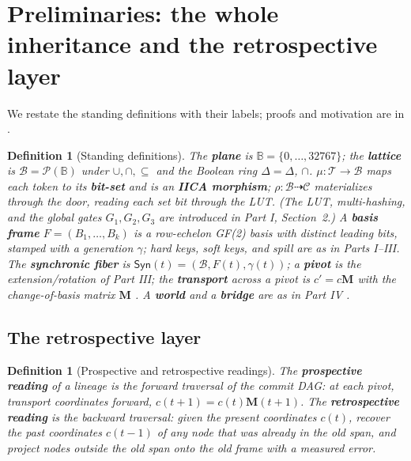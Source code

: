 \documentclass[11pt,a4paper]{article}
\newtheorem{definition}[principle]{Definition}
\theoremstyle{remark}
\newcommand{\Plane}{\ensuremath{\mathbb{B}}}            %
\newcommand{\Lat}{\ensuremath{\mathcal{B}}}              %
\newcommand{\Tok}{\ensuremath{\mathcal{T}}}              %
\newcommand{\xor}{\ensuremath{\Delta}}                   %
\newcommand{\Ctx}{\ensuremath{\mathcal{C}}}              %
\newcommand{\Ing}{\ensuremath{\mu}}                      %
\newcommand{\Mat}{\ensuremath{\rho}}                     %
\newcommand{\Sync}{\ensuremath{\mathsf{Syn}}}            %
\newcommand{\Gen}{\ensuremath{\gamma}}                   %
\newcommand{\Change}{\ensuremath{\mathbf{M}}}            %
\begin{document}
\section{Preliminaries: the whole inheritance and the retrospective layer}
\label{sec:prelim}

We restate the standing definitions with their labels; proofs and motivation
are in \cite{part1,part2,part3,part4}.

\begin{definition}[Standing definitions]
\label{def:standing}
The \textbf{plane} is $\Plane=\{0,\dots,32767\}$; the \textbf{lattice} is
$\Lat=\mathcal{P}(\Plane)$ under $\cup,\cap,\subseteq$ and the Boolean ring
$\xor=\Delta$, $\cap$. $\Ing:\Tok\to\Lat$ maps each token to its
\textbf{bit-set} and is an \textbf{IICA morphism};
$\Mat:\Lat\dashrightarrow\Ctx$ materializes through the door, reading each
set bit through the LUT. (The LUT, multi-hashing, and the global gates
$G_1,G_2,G_3$ are introduced in Part I, Section~2.) A
\textbf{basis frame} $F=(B_1,\dots,B_k)$ is a row-echelon GF(2) basis with
distinct leading bits, stamped with a generation $\Gen$; hard keys, soft
keys, and spill are as in Parts I--III. The \textbf{synchronic fiber} is
$\Sync(t)=(\Lat,F(t),\Gen(t))$; a \textbf{pivot} is the extension/rotation
of Part III; the \textbf{transport} across a pivot is $c' = c\Change$ with
the change-of-basis matrix $\Change$ \cite{part3}. A \textbf{world} and a
\textbf{bridge} are as in Part IV \cite{part4}.
\end{definition}

\subsection{The retrospective layer}

\begin{definition}[Prospective and retrospective readings]
\label{def:perspectives}
The \textbf{prospective reading} of a lineage is the forward traversal of the
commit DAG: at each pivot, transport coordinates forward,
$c(t{+}1) = c(t)\Change(t{+}1)$. The \textbf{retrospective reading} is the
backward traversal: given the present coordinates $c(t)$, recover the past
coordinates $c(t{-}1)$ of any node that was already in the old span, and
project nodes outside the old span onto the old frame with a measured error.
\end{definition}
\end{document}

